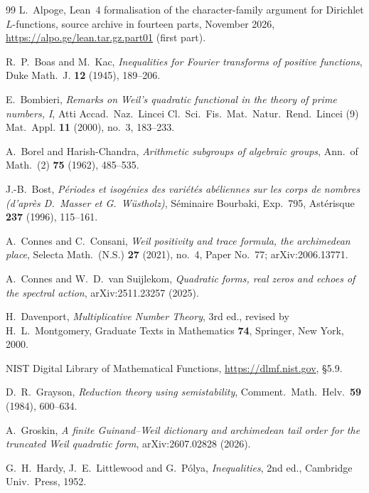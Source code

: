 \documentclass[10pt]{amsart}
\theoremstyle{definition}
\theoremstyle{remark}
\begin{document}
\begin{thebibliography}{99}
 L.~Alpoge, Lean~4 formalisation of the character-family argument
for Dirichlet $L$-functions, source archive in fourteen parts, November 2026,
\url{https://alpo.ge/lean.tar.gz.part01} (first part).

 R.~P.~Boas and M.~Kac, \emph{Inequalities for Fourier transforms of positive
functions}, Duke Math.~J. \textbf{12} (1945), 189--206.

 E.~Bombieri, \emph{Remarks on Weil's quadratic functional in the theory of
prime numbers, I}, Atti Accad.~Naz.~Lincei Cl.~Sci.~Fis.~Mat.~Natur.~Rend.~Lincei (9) Mat.~Appl.
\textbf{11} (2000), no.~3, 183--233.

 A.~Borel and Harish-Chandra, \emph{Arithmetic subgroups of algebraic groups},
Ann.\ of Math.\ (2) \textbf{75} (1962), 485--535.

 J.-B.~Bost, \emph{P\'eriodes et isog\'enies des vari\'et\'es ab\'eliennes sur
les corps de nombres (d'apr\`es D.~Masser et G.~W\"ustholz)}, S\'eminaire Bourbaki, Exp.~795,
Ast\'erisque \textbf{237} (1996), 115--161.

 A.~Connes and C.~Consani, \emph{Weil positivity and trace formula, the archimedean place}, Selecta Math.\ (N.S.) \textbf{27} (2021), no.~4, Paper No.~77; arXiv:2006.13771.

 A.~Connes and W.~D.~van Suijlekom, \emph{Quadratic forms, real zeros and echoes of the spectral action}, arXiv:2511.23257 (2025).

 H.~Davenport, \emph{Multiplicative Number Theory}, 3rd ed., revised by
H.~L.~Montgomery, Graduate Texts in Mathematics \textbf{74}, Springer, New York, 2000.

 NIST Digital Library of Mathematical Functions, \url{https://dlmf.nist.gov}, \S5.9.

 D.~R.~Grayson, \emph{Reduction theory using semistability}, Comment.\
Math.\ Helv.\ \textbf{59} (1984), 600--634.

 A.~Groskin, \emph{A finite Guinand--Weil dictionary and archimedean tail
order for the truncated Weil quadratic form}, arXiv:2607.02828 (2026).

 G.~H.~Hardy, J.~E.~Littlewood and G.~P\'olya, \emph{Inequalities}, 2nd ed., Cambridge Univ.~Press, 1952.


\end{thebibliography}
\end{document}
